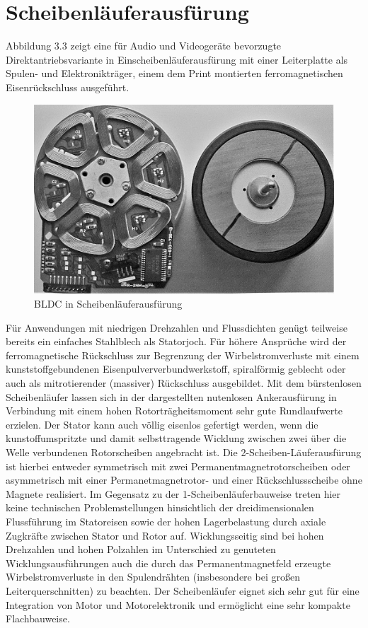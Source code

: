 \section{Scheibenläuferausfürung}
Abbildung 3.3 zeigt eine für Audio und Videogeräte bevorzugte Direktantriebsvariante in Einscheibenläuferausfürung mit einer Leiterplatte als Spulen- und Elektronikträger, einem dem Print montierten ferromagnetischen Eisenrückschluss ausgeführt.
\begin{figure}[H]
  \centering
  \includegraphics[width=12cm]{./Grafiken/3_3}
  \caption[BLDC in Scheibenläuferausfürung]{BLDC in Scheibenläuferausfürung \parencite[S. 77]{Stölting2011}}
  \label{fig:3_3}
\end{figure}
Für Anwendungen mit niedrigen Drehzahlen und Flussdichten genügt teilweise bereits ein einfaches Stahlblech als Statorjoch. Für höhere Ansprüche wird der ferromagnetische Rückschluss zur Begrenzung der Wirbelstromverluste mit einem kunststoffgebundenen Eisenpulververbundwerkstoff, spiralförmig geblecht oder auch als mitrotierender (massiver) Rückschluss ausgebildet.
Mit dem bürstenlosen Scheibenläufer lassen sich in der dargestellten nutenlosen Ankerausfürung in Verbindung mit einem hohen Rotorträgheitsmoment sehr gute Rundlaufwerte erzielen. Der Stator kann auch völlig eisenlos gefertigt werden, wenn die kunstoffumspritzte und damit selbsttragende Wicklung zwischen zwei über die Welle verbundenen Rotorscheiben angebracht ist. Die 2-Scheiben-Läuferausfürung ist hierbei entweder symmetrisch mit zwei Permanentmagnetrotorscheiben oder asymmetrisch mit einer Permanetmagnetrotor- und einer Rückschlussscheibe ohne Magnete realisiert. Im Gegensatz zu der 1-Scheibenläuferbauweise treten hier keine technischen Problemstellungen hinsichtlich der dreidimensionalen Flussführung im Statoreisen sowie der hohen Lagerbelastung durch axiale Zugkräfte zwischen Stator und Rotor auf.
Wicklungsseitig sind bei hohen Drehzahlen und hohen Polzahlen im Unterschied zu genuteten Wicklungsausführungen auch die durch das Permanentmagnetfeld erzeugte Wirbelstromverluste in den Spulendrähten (insbesondere bei großen Leiterquerschnitten) zu beachten.
Der Scheibenläufer eignet sich sehr gut für eine Integration von Motor und Motorelektronik und ermöglicht eine sehr kompakte Flachbauweise.\parencite[S. 77-78]{Stölting2011}
